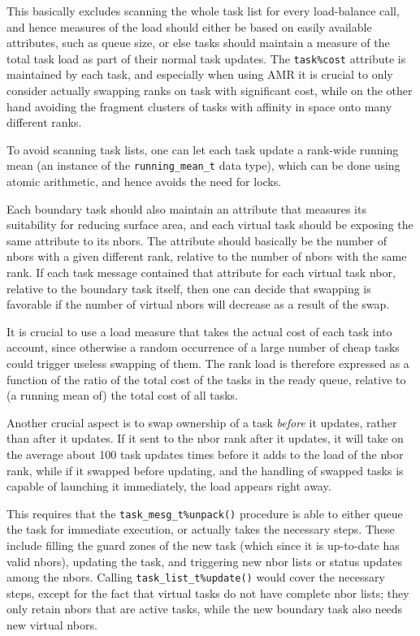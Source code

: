 \documentclass[paper=a4,fontsize=11pt]{scrartcl}
\numberwithin{equation}{section}		%
\numberwithin{figure}{section}			%
\numberwithin{table}{section}				%
\newcommand{\codecolor}{\color{Blue}}
\newcommand{\Code}[1]{{\codecolor\texttt{#1}}}
\begin{document}
This basically excludes scanning the whole task list for every load-balance call, and hence measures of the load should either be based on easily available attributes, such as queue size, or else tasks should maintain a measure of the total task load as part of their normal task updates.  The \Code{task\%cost} attribute is maintained by each task, and especially when using AMR it is crucial to only consider actually swapping ranks on task with significant cost, while on the other hand avoiding the fragment clusters of tasks with affinity in space onto many different ranks. 

To avoid scanning task lists, one can let each task update a rank-wide running mean (an instance of the \Code{running\_mean\_t} data type), which can be done using atomic arithmetic, and hence avoids the need for locks.

Each boundary task should also maintain an attribute that measures its suitability for reducing surface area, and each virtual task should be exposing the same attribute to its nbors.  The attribute should basically be the number of nbors with a given different rank, relative to the number of nbors with the same rank.  If each task message contained that attribute for each virtual task nbor, relative to the boundary task itself, then one can decide that swapping is favorable if the number of virtual nbors will decrease as a result of the swap.

It is crucial to use a load measure that takes the actual cost of each task into account, since otherwise a random occurrence of a large number of cheap tasks could trigger useless swapping of them.  The rank load is therefore expressed as a function of the ratio of the total cost of the tasks in the ready queue, relative to (a running mean of) the total cost of all tasks.

Another crucial aspect is to swap ownership of a task \textit{before} it updates, rather than after it updates.  If it sent to the nbor rank after it updates, it will take on the average about 100 task updates times before it adds to the load of the nbor rank, while if it swapped before updating, and the handling of swapped tasks is capable of launching it immediately, the load appears right away.

This requires that the \Code{task\_mesg\_t\%unpack()} procedure is able to either queue the task for immediate execution, or actually takes the necessary steps.  These include filling the guard zones of the new task (which since it is up-to-date has valid nbors), updating the task, and triggering new  nbor lists or status updates among the nbors.  Calling \Code{task\_list\_t\%update()} would cover the necessary steps, except for the fact that virtual tasks do not have complete nbor lists; they only retain nbors that are active tasks, while the new boundary task also needs new virtual nbors.
\end{document}

